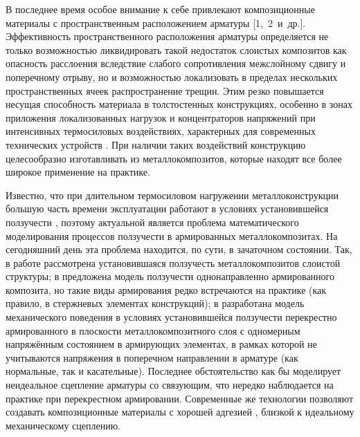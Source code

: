 
\date{25/X/2011}

\maketitle


 В последнее время особое внимание к себе
привлекают композиционные материалы с пространственным
расположением арматуры [1,~2~и~др.]. 
Эффективность пространственного расположения арматуры определяется не только
возможностью ликвидировать такой недостаток слоистых композитов
как опасность расслоения вследствие слабого сопротивления
межслойному сдвигу и поперечному отрыву, но и возможностью
локализовать в пределах нескольких пространственных ячеек
распространение трещин. Этим резко повышается несущая способность
материала в толстостенных конструкциях, особенно в зонах
приложения локализованных нагрузок и концентраторов напряжений при
интенсивных термосиловых воздействиях, характерных для современных
технических устройств \cite{yank:bib1}. При наличии таких
воздействий конструкцию целесообразно изготавливать из
металлокомпозитов, которые находят все более широкое применение на
практике.

Известно, что при длительном термосиловом нагружении
металлоконструкции большую часть времени эксплуатации работают в
условиях установившейся ползучести \cite{yank:bib3}, поэтому
актуальной является проблема математического моделирования
процессов ползучести в армированных металлокомпозитах. На
сегодняшний день эта проблема находится, по сути, в зачаточном
состоянии. Так, в работе \cite{yank:bib4} рассмотрена
установившаяся ползучесть металлокомпозитов слоистой структуры; в
\cite{yank:bib5} предложена модель ползучести однонаправленно
армированного композита, но такие виды армирования редко
встречаются на практике (как правило, в стержневых элементах
конструкций); в \cite{yank:bib6} разработана модель механического
поведения в условиях установившейся ползучести перекрестно
армированного в плоскости металлокомпозитного слоя с одномерным
напряжённым состоянием в армирующих элементах, в рамках которой не
учитываются напряжения в поперечном направлении в арматуре (как
нормальные, так и касательные). Последнее обстоятельство как бы
моделирует неидеальное сцепление арматуры со связующим, что
нередко наблюдается на практике при перекрестном армировании.
Современные же технологии позволяют создавать композиционные
материалы с хорошей адгезией \cite{yank:bib5}, близкой к
идеальному механическому сцеплению.

